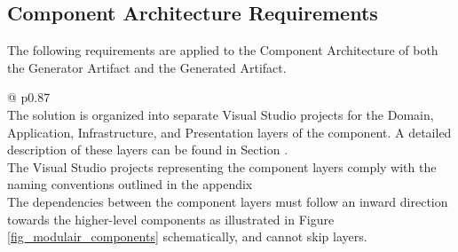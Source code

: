\subsection{Component Architecture Requirements}
 
The following requirements are applied to the Component Architecture of both the Generator
Artifact and the Generated Artifact.

\begin{table}[H]
    \begin{tabular}{@{\makebox[2em][c]{\rownumber\space}}  p{0.87\linewidth}}
        \\ 
    \hline
    The solution is organized into separate Visual Studio projects for the Domain,
    Application, Infrastructure, and Presentation layers of the component. A detailed
    description of these layers can be found in Section .
    \\
    The Visual Studio projects representing the component layers comply with the naming
    conventions outlined in the appendix  \\
       
    The dependencies between the component layers must follow an inward direction towards
    the higher-level components as illustrated in Figure \ref{fig_modulair_components}
    schematically, and cannot skip layers. \\
       \hline
    \end{tabular}
\caption{The Component Architecture Requirements}
\label{table_component_requirements}
\end{table}

